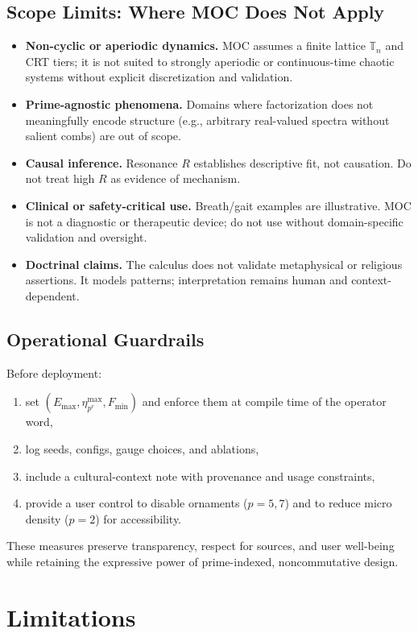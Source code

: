 \documentclass[12pt]{article}
\numberwithin{equation}{section}
\theoremstyle{plain}
\theoremstyle{definition}
\theoremstyle{remark}
\begin{document}
\subsection*{Scope Limits: Where MOC Does Not Apply}
\begin{itemize}
  \item \textbf{Non-cyclic or aperiodic dynamics.} MOC assumes a finite lattice \(\mathbb{T}_n\) and CRT tiers; it is not suited to strongly aperiodic or continuous-time chaotic systems without explicit discretization and validation.
  \item \textbf{Prime-agnostic phenomena.} Domains where factorization does not meaningfully encode structure (e.g., arbitrary real-valued spectra without salient combs) are out of scope.
  \item \textbf{Causal inference.} Resonance $R$ establishes descriptive fit, not causation. Do not treat high $R$ as evidence of mechanism.
  \item \textbf{Clinical or safety-critical use.} Breath/gait examples are illustrative. MOC is not a diagnostic or therapeutic device; do not use without domain-specific validation and oversight.
  \item \textbf{Doctrinal claims.} The calculus does not validate metaphysical or religious assertions. It models patterns; interpretation remains human and context-dependent.
\end{itemize}

\subsection*{Operational Guardrails}
Before deployment:
\begin{enumerate}
  \item set \((E_{\max},\eta_{p^r}^{\max},F_{\min})\) and enforce them at compile time of the operator word,
  \item log seeds, configs, gauge choices, and ablations,
  \item include a cultural-context note with provenance and usage constraints,
  \item provide a user control to disable ornaments (\(p=5,7\)) and to reduce micro density (\(p=2\)) for accessibility.
\end{enumerate}
These measures preserve transparency, respect for sources, and user well-being while retaining the expressive power of prime-indexed, noncommutative design.

\section*{Limitations}
\end{document}
